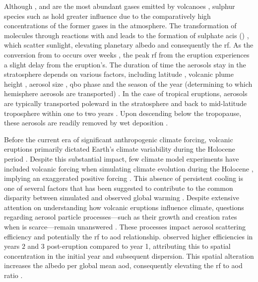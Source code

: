 \documentclass{ametsocV6.1}
\begin{document}
Although ,  and  are the most abundant gases emitted by volcanoes
\citep{robock2000}, sulphur species such as  hold greater influence due to the
comparatively high concentrations of the former gases in the atmosphere. The
transformation of  molecules through reactions with  and  leads
to the formation of sulphate acis () \citep{robock2000}, which scatter
sunlight, elevating planetary albedo and consequently the \gls{rf}. As the conversion
from  to  occurs over weeks \citep{robock2000}, the peak \gls{rf} from
the eruption experiences a slight delay from the eruption's. The duration of time the
 aerosols stay in the stratosphere depends on various factors, including
latitude \citep{marshall2019, toohey2019}, volcanic plume height \citep{marshall2019},
aerosol size \citep{marshall2019}, \gls{qbo} phase \citep{pitari2016b} and the season of
the year (determining to which hemisphere aerosols are transported)
\citep{toohey2011,toohey2019}. In the case of tropical eruptions, aerosols are typically
transported poleward in the stratosphere and back to mid-latitude troposphere within one
to two years \citep{robock2000}. Upon descending below the tropopause, these aerosols
are readily removed by wet deposition \citep{liu2012}.

Before the current era of significant anthropogenic climate forcing, volcanic eruptions
primarily dictated Earth's climate variability during the Holocene period
\citep{sigl2022}. Despite this substantial impact, few climate model experiments have
included volcanic forcing when simulating climate evolution during the Holocene
\citep{sigl2022}, implying an exaggerated positive forcing
\citep{gregory2016,solomon2011}. This absence of persistent cooling is one of several
factors that has been suggested to contribute to the common disparity between simulated
and observed global warming \citep{andersson2015}. Despite extensive attention on
understanding how volcanic eruptions influence climate, questions regarding aerosol
particle processes---such as their growth and creation rates when  is
scarce---remain unanswered
\citep[e.g.][]{robock2000,zanchettin2019,marshall2020,marshall2022}. These processes
impact aerosol scattering efficiency and potentially the \gls{rf} to \gls{aod}
relationship. \citet{marshall2020} observed higher efficiencies in years \(2\) and \(3\)
post-eruption compared to year 1, attributing this to spatial concentration in the
initial year and subsequent dispersion. This spatial alteration increases the albedo per
global mean \gls{aod}, consequently elevating the \gls{rf} to \gls{aod} ratio
\citep{marshall2020}.
\end{document}
